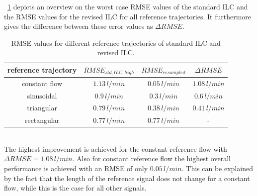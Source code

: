 \tablename~\ref{tab:compare_ILC} depicts an overview on the worst case RMSE values of the standard ILC and the RMSE values for the revised ILC for all reference trajectories. It furthermore gives the difference between these error values as $\Delta{RMSE}$.
\begin{table}[h]
  \centering
  \begin{tabular}{c|c|c|c}
    \toprule
     reference trajectory & $RMSE_{std\_ILC,high}$ & $RMSE_{resampled}$ & $\Delta{RMSE}$\\
    \midrule
    constant flow & $1.13\,l/min$ & $0.05\,l/min$ & $1.08\,l/min$ \\
    sinusoidal & $0.9\,l/min$ & $0.3\,l/min$ & $0.6\,l/min$ \\
    triangular & $0.79\,l/min$ & $0.38\,l/min$ & $0.41\,l/min$ \\
    rectangular & $0.77\,l/min$ & $0.77\,l/min$ & - \\
    \bottomrule
\end{tabular}
  \caption[RMSE values for different reference trajectories of standard ILC and revised ILC]{RMSE values for different reference trajectories of standard ILC and revised ILC.}
  \label{tab:compare_ILC}
\end{table}
\\The highest improvement is achieved for the constant reference flow with $\Delta{RMSE}=1.08\,l/min$. Also for constant reference flow the highest overall performance is achieved with an RMSE of only $0.05\,l/min$. This can be explained by the fact that the length of the reference signal does not change for a constant flow, while this is the case for all other signals.
